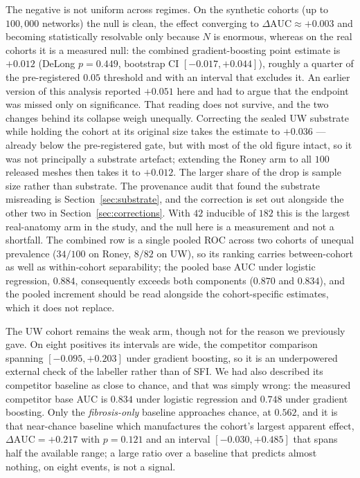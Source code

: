 \documentclass[11pt]{article}
\theoremstyle{definition}
\newcommand{\dAUC}{\Delta\mathrm{AUC}}
\begin{document}
The negative is not uniform across regimes. On the synthetic cohorts (up to
$100{,}000$ networks) the null is clean, the effect converging to
$\dAUC\approx+0.003$ and becoming statistically resolvable only because $N$ is
enormous, whereas on the real cohorts it is a measured null: the combined
gradient-boosting point estimate is $+0.012$ (DeLong $p=0.449$, bootstrap CI
$[-0.017,+0.044]$), roughly a quarter of the pre-registered $0.05$ threshold and
with an interval that excludes it. An earlier version of this analysis reported
$+0.051$ here and had to argue that the endpoint was missed only on
significance. That reading does not survive, and the two changes behind its
collapse weigh unequally. Correcting the sealed UW substrate while holding the
cohort at its original size takes the estimate to $+0.036$ --- already below the
pre-registered gate, but with most of the old figure intact, so it was not
principally a substrate artefact; extending the Roney arm to all $100$ released
meshes then takes it to $+0.012$. The larger share of the drop is sample size
rather than substrate. The provenance audit that found the substrate misreading
is Section~\ref{sec:substrate}, and the correction is set out alongside the other
two in Section~\ref{sec:corrections}. With $42$
inducible of $182$ this is the largest real-anatomy arm in the study, and the
null here is a measurement and not a shortfall. The combined row is a single
pooled ROC across two cohorts of unequal prevalence ($34/100$ on Roney, $8/82$
on UW), so its ranking carries between-cohort as well as within-cohort
separability; the pooled base AUC under logistic regression, $0.884$,
consequently exceeds both components ($0.870$ and $0.834$), and the pooled
increment should be read alongside the cohort-specific estimates, which it does
not replace.

The UW cohort remains the weak arm, though not for the reason we previously
gave. On eight positives its intervals are wide, the competitor comparison
spanning $[-0.095,+0.203]$ under gradient boosting, so it is an underpowered
external check of the labeller rather than of SFI. We had also described its
competitor baseline as close to chance, and that was simply wrong: the measured
competitor base AUC is $0.834$ under logistic regression and $0.748$ under
gradient boosting. Only the \emph{fibrosis-only} baseline approaches chance, at
$0.562$, and it is that near-chance baseline which manufactures the cohort's
largest apparent effect, $\dAUC=+0.217$ with $p=0.121$ and an interval
$[-0.030,+0.485]$ that spans half the available range; a large ratio over a
baseline that predicts almost nothing, on eight events, is not a signal.
\end{document}
